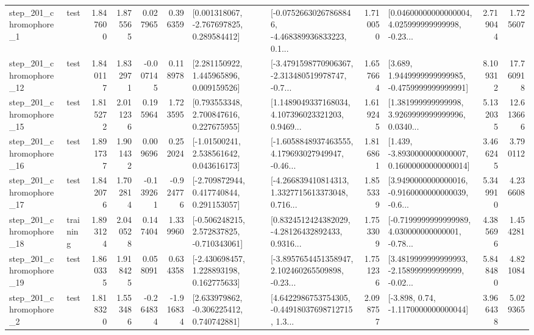 \begin{tabular}{llrrrrllrlrr}
   step\_201\_chromophore\_1 &      test &      1.847600 &    1.875565 &      0.027965 &  0.396359 &    [0.001318067, -2.767697825, 0.289584412] &  [-0.07526630267868846, -4.468389936833223, 0.1... &       1.710050 &  [0.04600000000000004, 4.025999999999998, -0.23... &            2.719044 &          1.725607 \\
  step\_201\_chromophore\_12 &      test &      1.840117 &    1.832971 &     -0.007145 &  0.118978 &     [2.281150922, 1.445965896, 0.009159526] &  [-3.4791598770906367, -2.313480519978747, -0.7... &       1.657664 &   [3.689, 1.9449999999999985, -0.4759999999999991] &            8.109312 &         17.760918 \\
  step\_201\_chromophore\_15 &      test &      1.815272 &    2.011236 &      0.195964 &  1.723595 &     [0.793553348, 2.700847616, 0.227675955] &  [1.1489049337168034, 4.107396023321203, 0.9469... &       1.619245 &  [1.381999999999998, 3.9269999999999996, 0.0340... &            5.132035 &         12.613666 \\
  step\_201\_chromophore\_16 &      test &      1.891737 &    1.901432 &      0.009696 &  0.252024 &     [-1.01500241, 2.538561642, 0.043616173] &  [-1.6058848937463555, 4.179693027949947, -0.46... &       1.816861 &  [1.439, -3.8930000000000007, 0.16000000000000014] &            3.466245 &          3.790112 \\
  step\_201\_chromophore\_17 &      test &      1.842076 &    1.702814 &     -0.139261 & -0.924776 &    [-2.709872944, 0.417740844, 0.291153057] &  [-4.266839410814313, 1.3327715613373048, 0.716... &       1.855339 &  [3.9490000000000016, -0.9160000000000039, -0.6... &            5.349910 &          4.236608 \\
  step\_201\_chromophore\_18 &  training &      1.893124 &    2.040528 &      0.147404 &  1.339960 &   [-0.506248215, 2.572837825, -0.710343061] &  [0.8324512424382029, -4.28126432892433, 0.9316... &       1.753309 &  [-0.7199999999999989, 4.030000000000001, -0.78... &            4.385696 &          1.454281 \\
  step\_201\_chromophore\_19 &      test &      1.860335 &    1.918425 &      0.058091 &  0.634358 &    [-2.430698457, 1.228893198, 0.162775633] &  [-3.8957654451358947, 2.102460265509898, -0.23... &       1.751236 &  [3.4819999999999993, -2.158999999999999, -0.02... &            5.848480 &          4.821084 \\
   step\_201\_chromophore\_2 &      test &      1.818320 &    1.553486 &     -0.264834 & -1.916834 &    [2.633979862, -0.306225412, 0.740742881] &  [4.6422986753754305, -0.44918037698712715, 1.3... &       2.098757 &                [-3.898, 0.74, -1.1170000000000044] &            3.966438 &          5.029365 \\

\end{tabular}

